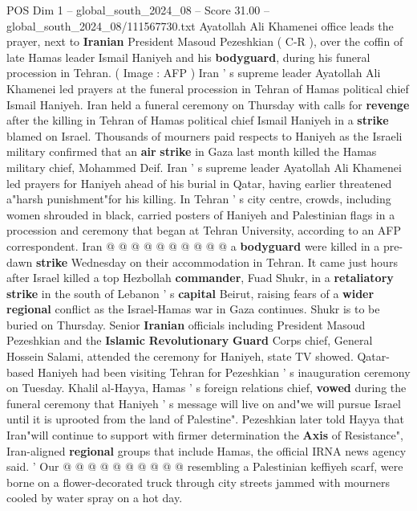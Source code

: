 \begin{textsample}{POS Dim 1 – global\_south\_2024\_08 – Score 31.00 – global\_south\_2024\_08/111567730.txt}  \label{ex:f1_pos_008}
Ayatollah Ali Khamenei office leads the prayer, next to \textbf{Iranian} President Masoud Pezeshkian ( C-R ), over the coffin of late Hamas leader Ismail Haniyeh and his \textbf{bodyguard}, during his funeral procession in Tehran. ( Image : AFP ) Iran ' s supreme leader Ayatollah Ali Khamenei led prayers at the funeral procession in Tehran of Hamas political chief Ismail Haniyeh.
Iran held a funeral ceremony on Thursday with calls for \textbf{revenge} after the killing in Tehran of Hamas political chief Ismail Haniyeh in a \textbf{strike} blamed on Israel.
Thousands of mourners paid respects to Haniyeh as the Israeli military confirmed that an \textbf{air} \textbf{strike} in Gaza last month killed the Hamas military chief, Mohammed Deif.
Iran ' s supreme leader Ayatollah Ali Khamenei led prayers for Haniyeh ahead of his burial in Qatar, having earlier threatened a"harsh punishment"for his killing.
In Tehran ' s city centre, crowds, including women shrouded in black, carried posters of Haniyeh and Palestinian flags in a procession and ceremony that began at Tehran University, according to an AFP correspondent.
Iran @ @ @ @ @ @ @ @ @ @ a \textbf{bodyguard} were killed in a pre-dawn \textbf{strike} Wednesday on their accommodation in Tehran.
It came just hours after Israel killed a top Hezbollah \textbf{commander}, Fuad Shukr, in a \textbf{retaliatory} \textbf{strike} in the south of Lebanon ' s \textbf{capital} Beirut, raising fears of a \textbf{wider} \textbf{regional} conflict as the Israel-Hamas war in Gaza continues.
Shukr is to be buried on Thursday.
Senior \textbf{Iranian} officials including President Masoud Pezeshkian and the \textbf{Islamic} \textbf{Revolutionary} \textbf{Guard} Corps chief, General Hossein Salami, attended the ceremony for Haniyeh, state TV showed.
Qatar-based Haniyeh had been visiting Tehran for Pezeshkian ' s inauguration ceremony on Tuesday.
Khalil al-Hayya, Hamas ' s foreign relations chief, \textbf{vowed} during the funeral ceremony that Haniyeh ' s message will live on and"we will pursue Israel until it is uprooted from the land of Palestine".
Pezeshkian later told Hayya that Iran"will continue to support with firmer determination the \textbf{Axis} of Resistance", Iran-aligned \textbf{regional} groups that include Hamas, the official IRNA news agency said. ' Our @ @ @ @ @ @ @ @ @ @ resembling a Palestinian keffiyeh scarf, were borne on a flower-decorated truck through city streets jammed with mourners cooled by water spray on a hot day.

\end{textsample}
